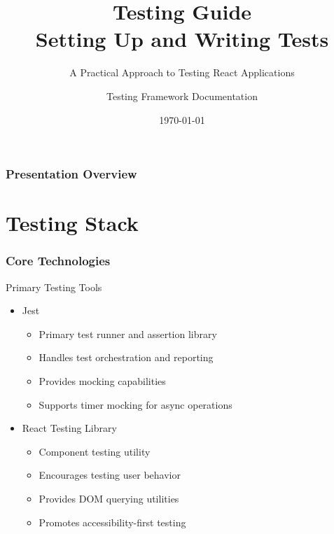 \documentclass{beamer}
\title{Testing Guide\\Setting Up and Writing Tests}
\subtitle{A Practical Approach to Testing React Applications}
\author{Testing Framework Documentation}
\date{\today}
\begin{document}
\frame{\titlepage}

\begin{frame}
    \frametitle{Presentation Overview}
    \tableofcontents
\end{frame}

\section{Testing Stack}
\begin{frame}
    \frametitle{Core Technologies}
    \begin{block}{Primary Testing Tools}
        \begin{itemize}
            \item Jest
            \begin{itemize}
                \item Primary test runner and assertion library
                \item Handles test orchestration and reporting
                \item Provides mocking capabilities
                \item Supports timer mocking for async operations
            \end{itemize}
            \pause
            \item React Testing Library
            \begin{itemize}
                \item Component testing utility
                \item Encourages testing user behavior
                \item Provides DOM querying utilities
                \item Promotes accessibility-first testing
            \end{itemize}
        \end{itemize}
    \end{block}
\end{frame}
\end{document}
